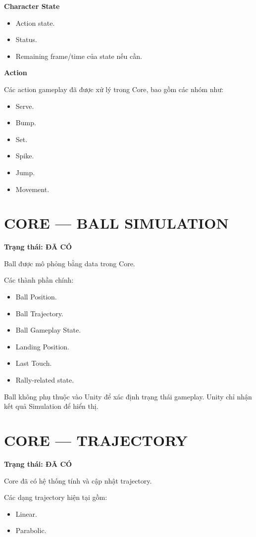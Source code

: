 \documentclass[12pt,a4paper]{article}
\begin{document}
\textbf{Character State}
\begin{itemize}[nosep]
  \item Action state.
  \item Status.
  \item Remaining frame/time của state nếu cần.
\end{itemize}

\textbf{Action}

Các action gameplay đã được xử lý trong Core, bao gồm các nhóm như:
\begin{itemize}[nosep]
  \item Serve.
  \item Bump.
  \item Set.
  \item Spike.
  \item Jump.
  \item Movement.
\end{itemize}

\section{CORE --- BALL SIMULATION}
\textbf{Trạng thái: ĐÃ CÓ}

Ball được mô phỏng bằng data trong Core.

Các thành phần chính:
\begin{itemize}[nosep]
  \item Ball Position.
  \item Ball Trajectory.
  \item Ball Gameplay State.
  \item Landing Position.
  \item Last Touch.
  \item Rally-related state.
\end{itemize}

Ball không phụ thuộc vào Unity để xác định trạng thái gameplay. Unity chỉ nhận kết quả Simulation để hiển thị.

\section{CORE --- TRAJECTORY}
\textbf{Trạng thái: ĐÃ CÓ}

Core đã có hệ thống tính và cập nhật trajectory.

Các dạng trajectory hiện tại gồm:
\begin{itemize}[nosep]
  \item Linear.
  \item Parabolic.
\end{itemize}
\end{document}
